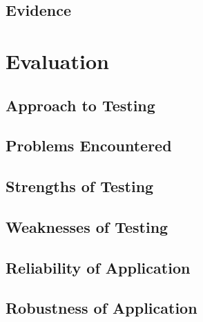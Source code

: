 \subsection{Evidence}

\section{Evaluation}

\subsection{Approach to Testing}

\subsection{Problems Encountered}

\subsection{Strengths of Testing}

\subsection{Weaknesses of Testing}

\subsection{Reliability of Application}

\subsection{Robustness of Application}